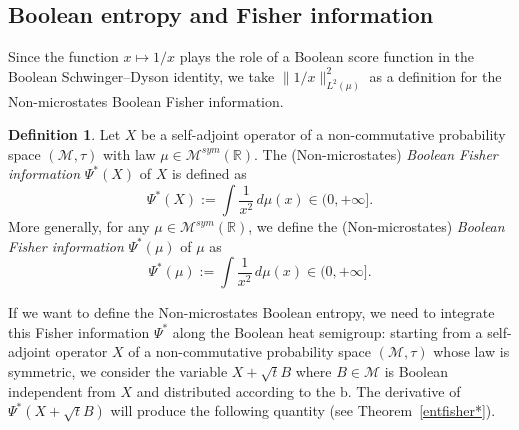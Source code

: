 \documentclass[10pt, reqno]{amsart}
\numberwithin{equation}{section}
\theoremstyle{definition}
\newtheorem{definition}{Definition}[section]
\theoremstyle{plain}
\theoremstyle{remark}
\newcommand{\R}{\mathbb{R}}
\newcommand{\1}{\mathbbm{1}}
\begin{document}
\subsection{Boolean entropy and Fisher information}\label{Sec1:booleanentropy*}
Since the function $x \mapsto 1/x$ plays the role of a Boolean score function
in the Boolean Schwinger–Dyson identity, we take $\|1/x\|^2_{L^2(\mu)}$ as a definition for the Non-microstates Boolean Fisher information.

\begin{definition}
Let $X$ be a self-adjoint operator of a non-commutative probability space $(\mathcal{M},\tau)$ with law $\mu\in\mathcal{M}^{sym}(\R)$. The (Non-microstates) \textit{Boolean Fisher information} $\Psi^*(X)$ of $X$ is defined as
\begin{equation}\label{Fisher*}
		\Psi^*(X):=\int \frac{1}{x^2}\,d\mu(x)\in (0,+\infty].
	\end{equation}
    More generally, for any $\mu \in\mathcal{M}^{sym}(\R)$, we define the (Non-microstates) \textit{Boolean Fisher information} $\Psi^*(\mu)$ of $\mu$ as
\begin{equation*}
		\Psi^*(\mu):=\int \frac{1}{x^2}\,d\mu(x)\in (0,+\infty].
	\end{equation*}
\end{definition}

    
If we want to define the Non-microstates Boolean entropy, we need to integrate this Fisher information $\Psi^*$ along the Boolean heat semigroup: starting from a self-adjoint operator $X$ of a non-commutative probability space $(\mathcal{M},\tau)$ whose law is symmetric, we consider the variable $X+\sqrt{t}B$ where $B\in \mathcal{M}$ is Boolean independent from $X$ and distributed according to the $\mathrm{b}.$ The derivative of $\Psi^*(X+\sqrt{t}B)$ will produce the following quantity (see Theorem~\ref{entfisher*}).
\end{document}
